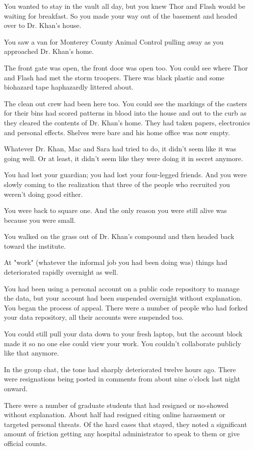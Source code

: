 \documentclass[a5paper, symmetric]{tufte-book}
\begin{document}
You wanted to stay in the vault all day, but you knew Thor and Flash would be waiting for breakfast. So you made your way out of the basement and headed over to Dr. Khan's house. 

You saw a van for Monterey County Animal Control pulling away as you approached Dr. Khan's home. 

The front gate was open, the front door was open too. You could see where Thor and Flash had met the storm troopers. There was black plastic and some biohazard tape haphazardly littered about. 

The clean out crew had been here too. You could see the markings of the casters for their bins had scored patterns in blood into the house and out to the curb as they cleared the contents of Dr. Khan's home. They had taken papers, electronics and personal effects. Shelves were bare and his home office was now empty.

Whatever Dr. Khan, Mac and Sara had tried to do, it didn't seem like it was going well. Or at least, it didn't seem like they were doing it in secret anymore.

You had lost your guardian; you had lost your four-legged friends. And you were slowly coming to the realization that three of the people who recruited you weren't doing good either. 
 
You were back to square one. And the only reason you were still alive was because you were small.

You walked on the grass out of Dr. Khan's compound and then headed back toward the institute. 

At "work" (whatever the informal job you had been doing was) things had deteriorated rapidly overnight as well. 

You had been using a personal account on a public code repository to manage the data, but your account had been suspended overnight without explanation. You began the process of appeal. There were a number of people who had forked your data repository, all their accounts were suspended too. 

You could still pull your data down to your fresh laptop, but the account block made it so no one else could view your work. You couldn't collaborate publicly like that anymore.

In the group chat, the tone had sharply deteriorated twelve hours ago. There were resignations being posted in comments from about nine o'clock last night onward.

There were a number of graduate students that had resigned or no-showed without explanation. About half had resigned citing online harassment or targeted personal threats. Of the hard cases that stayed, they noted a significant amount of friction getting any hospital administrator to speak to them or give official counts. 
\end{document}
